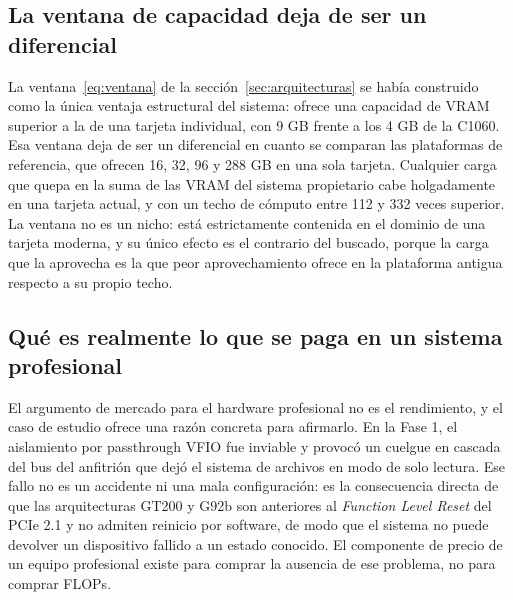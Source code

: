 \documentclass[a4paper,11pt]{article}
\begin{document}
\subsection*{La ventana de capacidad deja de ser un diferencial}

La ventana~\eqref{eq:ventana} de la sección~\ref{sec:arquitecturas} se había construido como la única ventaja estructural del
sistema: ofrece una capacidad de VRAM superior a la de una tarjeta individual, con 9 GB frente a los 4 GB de la C1060. Esa
ventana deja de ser un diferencial en cuanto se comparan las plataformas de referencia, que ofrecen 16, 32, 96 y 288 GB en una
sola tarjeta. Cualquier carga que quepa en la suma de las VRAM del sistema propietario cabe holgadamente en una tarjeta actual, y
con un techo de cómputo entre 112 y 332 veces superior. La ventana no es un nicho: está estrictamente contenida en el dominio de
una tarjeta moderna, y su único efecto es el contrario del buscado, porque la carga que la aprovecha es la que peor
aprovechamiento ofrece en la plataforma antigua respecto a su propio techo.

\subsection*{Qué es realmente lo que se paga en un sistema profesional}

El argumento de mercado para el hardware profesional no es el rendimiento, y el caso de estudio ofrece una razón concreta para
afirmarlo. En la Fase 1, el aislamiento por passthrough VFIO fue inviable y provocó un cuelgue en cascada del bus del anfitrión
que dejó el sistema de archivos en modo de solo lectura. Ese fallo no es un accidente ni una mala configuración: es la
consecuencia directa de que las arquitecturas GT200 y G92b son anteriores al \textit{Function Level Reset} del PCIe 2.1 y no
admiten reinicio por software, de modo que el sistema no puede devolver un dispositivo fallido a un estado conocido. El
componente de precio de un equipo profesional existe para comprar la ausencia de ese problema, no para comprar FLOPs.
\end{document}
